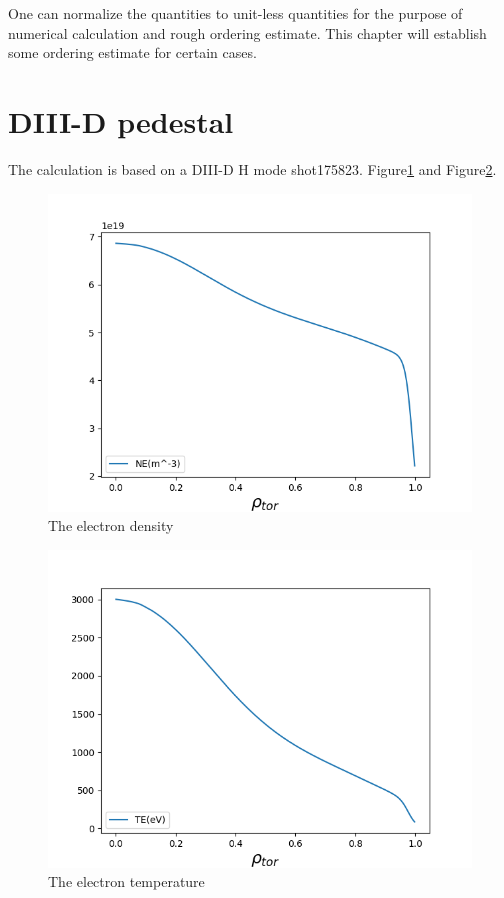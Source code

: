 One can normalize the quantities to unit-less quantities for the purpose of numerical calculation and rough ordering estimate. This chapter will establish some ordering estimate for certain cases.

\section{DIII-D pedestal}

The calculation is based on a DIII-D H mode shot175823. Figure\ref{fig:ne} and Figure\ref{fig:Te}. 

\begin{figure}[h] \centering
        \includegraphics[width=1\textwidth]{Image/ne.png}
        \caption{The electron density}
        \label{fig:ne}
\end{figure}

\begin{figure}[h] \centering
        \includegraphics[width=1\textwidth]{Image/Te.png}
        \caption{The electron temperature}
        \label{fig:Te}
\end{figure}

